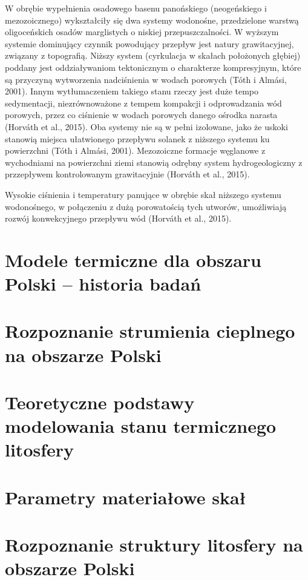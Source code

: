 \documentclass[11.5pt,twoside]{report}
\begin{document}
 W obrębie wypełnienia osadowego basenu panońskiego (neogeńskiego i mezozoicznego) wykształciły się dwa systemy wodonośne, przedzielone warstwą oligoceńskich osadów marglistych o niskiej przepuszczalności. W wyższym systemie dominujący czynnik powodujący przepływ jest natury grawitacyjnej, związany z topografią. Niższy system (cyrkulacja w skałach położonych głębiej) poddany jest oddziaływaniom tektonicznym o charakterze kompresyjnym, które są przyczyną wytworzenia nadciśnienia w wodach porowych (T\'{o}th i Alm\'{a}si, 2001). Innym wytłumaczeniem takiego stanu rzeczy jest duże tempo sedymentacji, niezrównoważone z tempem kompakcji i odprowadzania wód porowych, przez co ciśnienie w wodach porowych danego ośrodka narasta (Horv\'{a}th et al., 2015). Oba systemy nie są w pełni izolowane, jako że uskoki stanowią miejsca ułatwionego przepływu solanek z niższego systemu ku powierzchni (T\'{o}th i Alm\'{a}si, 2001). Mezozoiczne formacje węglanowe z wychodniami na powierzchni ziemi stanowią odrębny system hydrogeologiczny z przzepływem kontrolowanym grawitacyjnie (Horv\'{a}th et al., 2015). 
 
 Wysokie ciśnienia i temperatury panujące w obrębie skał niższego systemu wodonośnego, w połączeniu z dużą porowatością tych utworów, umożliwiają rozwój konwekcyjnego przepływu wód (Horv\'{a}th et al., 2015). 
 
 	\chapter{Modele termiczne dla obszaru Polski -- historia badań}
 
 	\chapter{Rozpoznanie strumienia cieplnego na obszarze Polski}
 
 	\chapter{Teoretyczne podstawy modelowania stanu termicznego litosfery}
 
 	\chapter{Parametry materiałowe skał}
 
 	\chapter{Rozpoznanie struktury litosfery na obszarze Polski}
 
\end{document}
